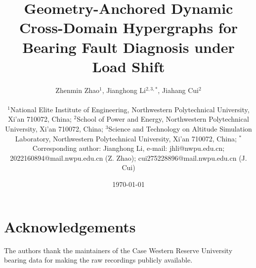 \documentclass[12pt]{article}
\title{Geometry-Anchored Dynamic Cross-Domain Hypergraphs for\\[4pt]
Bearing Fault Diagnosis under Load Shift}
\author{%
Zhenmin Zhao$^{1}$, Jianghong Li$^{2,3,\ast}$, Jiahang Cui$^{2}$\\[8pt]
\footnotesize
\parbox{0.92\textwidth}{\centering
$^{1}$National Elite Institute of Engineering, Northwestern Polytechnical University, Xi'an 710072, China; $^{2}$School of Power and Energy, Northwestern Polytechnical University, Xi'an 710072, China; $^{3}$Science and Technology on Altitude Simulation Laboratory, Northwestern Polytechnical University, Xi'an 710072, China; $^{\ast}$Corresponding author: Jianghong Li, e-mail: jhli@nwpu.edu.cn; 2022160894@mail.nwpu.edu.cn (Z. Zhao); cui275228896@mail.nwpu.edu.cn (J. Cui)}%
}
\date{\today}
\begin{document}
\maketitle











\section*{Acknowledgements}
The authors thank the maintainers of the Case Western Reserve University
bearing data for making the raw recordings publicly available.


\end{document}
